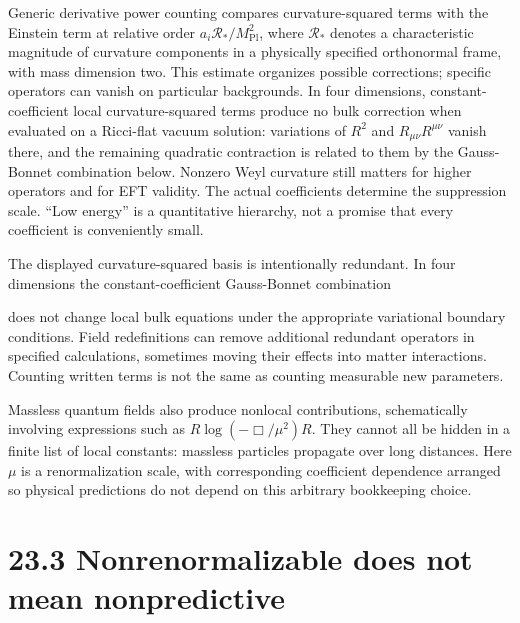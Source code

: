 \documentclass[
  11pt,
  letterpaper,
  oneside,
  openany]{scrbook}
\begin{document}
Generic derivative power counting compares curvature-squared terms with
the Einstein term at relative order
\(a_i\mathcal R_*/M_{\mathrm{Pl}}^2\), where \(\mathcal R_*\) denotes a
characteristic magnitude of curvature components in a physically
specified orthonormal frame, with mass dimension two. This estimate
organizes possible corrections; specific operators can vanish on
particular backgrounds. In four dimensions, constant-coefficient local
curvature-squared terms produce no bulk correction when evaluated on a
Ricci-flat vacuum solution: variations of \(R^2\) and
\(R_{\mu\nu}R^{\mu\nu}\) vanish there, and the remaining quadratic
contraction is related to them by the Gauss-Bonnet combination below.
Nonzero Weyl curvature still matters for higher operators and for EFT
validity. The actual coefficients determine the suppression scale. ``Low
energy'' is a quantitative hierarchy, not a promise that every
coefficient is conveniently small.

The displayed curvature-squared basis is intentionally redundant. In
four dimensions the constant-coefficient Gauss-Bonnet combination

\begin{center}
\begingroup
{}
\ifdim\wd\grmathbox>\linewidth
\resizebox{\linewidth}{!}{\usebox{\grmathbox}}
\else\usebox{\grmathbox}\fi
\endgroup
\end{center}

does not change local bulk equations under the appropriate variational
boundary conditions. Field redefinitions can remove additional redundant
operators in specified calculations, sometimes moving their effects into
matter interactions. Counting written terms is not the same as counting
measurable new parameters.

Massless quantum fields also produce nonlocal contributions,
schematically involving expressions such as \(R\log(-\Box/\mu^2)R\).
They cannot all be hidden in a finite list of local constants: massless
particles propagate over long distances. Here \(\mu\) is a
renormalization scale, with corresponding coefficient dependence
arranged so physical predictions do not depend on this arbitrary
bookkeeping choice.

\hypertarget{nonrenormalizable-does-not-mean-nonpredictive}{%
\section{23.3 Nonrenormalizable does not mean
nonpredictive}\label{nonrenormalizable-does-not-mean-nonpredictive}}
\end{document}
